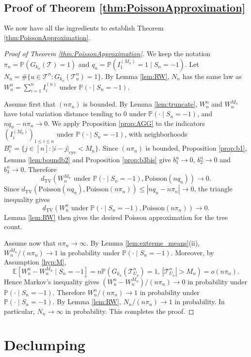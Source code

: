 \documentclass[a4paper,11pt]{article}
\newcommand{\E}{\mathbb{E}}
\DeclareRobustCommand{\P}{\mathbb{P}}
\DeclareRobustCommand{\1}{\mathbf{1}}
\newcommand{\dTV}{d_{\mathrm{TV}}}
\newcommand{\Po}{\mathrm{Poisson}}
\begin{document}
\subsection{Proof of Theorem \ref{thm:PoissonApproximation}}


We now have all the ingredients to establish  Theorem \ref{thm:PoissonApproximation}.

\begin{proof}[Proof of Theorem \ref{thm:PoissonApproximation}]
We keep the notation $\pi_n=\P(G_{k_n}(\mathcal T)=1)$ and
$q_n=\P(I_1^{(M_n)}=1\mid S_n=-1)$. Let
$N_n=\#\{u\in\mathcal T^n:G_{k_n}(\mathcal T^n_u)=1\}$.
By Lemma \ref{lem:RW}, $N_n$ has the same law as
$W_n^n=\sum_{i=1}^n I_i^{(n)}$ under $\P(\cdot\mid S_n=-1)$.

Assume first that $(n\pi_n)$ is bounded. By Lemma \ref{lem:truncate},
$W_n^n$ and $W_n^{M_n}$ have total variation distance tending to $0$ under
$\P(\cdot\mid S_n=-1)$, and $nq_n-n\pi_n\to0$. We apply Proposition
\ref{prop:AGG} to the indicators $(I_i^{(M_n)})_{1\le i\le n}$ under
$\P(\cdot\mid S_n=-1)$, with neighborhoods
$B_i^n=\{j\in[n]: |i-j|_{\mathrm{cyc}}<M_n\}$. Since $(n\pi_n)$ is bounded,
Proposition \ref{prop:b1}, Lemma \ref{lem:boundb2} and Proposition
\ref{prop:b3bis} give $b_1^n\to0$, $b_2^n\to0$ and $b_3^n\to0$. Therefore
$$
\dTV(W_n^{M_n} \textrm{ under } \P( \cdot \mid S_{n}=-1),\Po(nq_n))\to0.
$$
Since $\dTV(\Po(nq_n),\Po(n\pi_n))\le |nq_n-n\pi_n|\to0$, the triangle
inequality gives
$$
\dTV(W_n^n \textrm{ under } \P( \cdot \mid S_{n}=-1),\Po(n\pi_n))\to0.
$$
Lemma \ref{lem:RW} then gives the desired
Poisson approximation for the tree count.




Assume now  that $n\pi_n\to\infty$.
By Lemma \ref{lem:extreme_means}\textup{(ii)},
$W_n^{M_n}/(n\pi_n)\to1$ in probability under $\P(\cdot\mid S_n=-1)$. Moreover,
by Assumption \ref{hyp:M},
$$
\E[W_n^n-W_n^{M_n}\mid S_n=-1]
=
n\P(G_{k_n}(\mathcal T^n_{U_n})=1,\ |\mathcal T^n_{U_n}|>M_n)
=
o(n\pi_n).
$$
Hence Markov's inequality gives
$(W_n^n-W_n^{M_n})/(n\pi_n)\to0$ in probability under
$\P(\cdot\mid S_n=-1)$. Therefore $W_n^n/(n\pi_n)\to1$ 
in probability under $\P(\cdot\mid S_n=-1)$. By Lemma \ref{lem:RW}, $
{N_n}/({n\pi_n})\to1$
in probability. In particular, $N_n\to\infty$ in probability. This completes the proof.
\end{proof}




\section{Declumping}
\label{sec:declumping}
\end{document}
